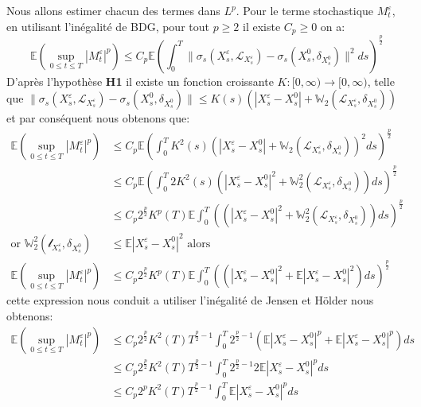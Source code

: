 \documentclass[12pt,a4paper,twoside,fleqn]{book}%
\theoremstyle{definition}
\theoremstyle{lemme}
\numberwithin{equation}{section}
\begin{document}
Nous allons estimer chacun des termes dans $L^p$. 
Pour le terme stochastique $M_t^\varepsilon$, en utilisant l'inégalité de BDG, pour tout $p\geq2$ il existe $C_p\geq0$ on a:
\[
\mathbb{E}\left(\sup_{0\leq t \leq T}|M_t^\varepsilon|^p\right)\leq C_p\mathbb{E}\left(\int_{0}^{T}\|\sigma_s(X_s^\varepsilon,\mathcal{L}_{X_s^\varepsilon})-\sigma_s(X_s^0,\delta_{X_s^0})\|^2ds\right)^{\frac{p}{2}}
\]
D’après l’hypothèse \textbf{H1} il existe un fonction croissante $K:[0,\infty)\to[0,\infty)$, telle que $\|\sigma_s(X_s^\varepsilon,\mathcal{L}_{X_s^\varepsilon})-\sigma_s(X_s^0,\delta_{X_s^0})\|\leq K(s)\left(|X_s^\varepsilon-X_s^0|+\mathbb{W}_2(\mathcal{L}_{X_s^\varepsilon},\delta_{X_s^0})\right)$ et par conséquent nous obtenons que:
\[
\begin{aligned}
\mathbb{E}\left(\sup_{0\leq t \leq T}|M_t^\varepsilon|^p\right)&\leq C_p\mathbb{E}\left(\int_{0}^{T}K^2(s)\left(|X_s^\varepsilon-X_s^0|+\mathbb{W}_2(\mathcal{L}_{X_s^\varepsilon},\delta_{X_s^0})\right)^2ds\right)^{\frac{p}{2}}\\
&\leq C_p\mathbb{E}\left(\int_{0}^{T}2K^2(s)\left(|X_s^\varepsilon-X_s^0|^2+\mathbb{W}_2^2(\mathcal{L}_{X_s^\varepsilon},\delta_{X_s^0})\right)ds\right)^{\frac{p}{2}}\\
&\leq C_p2^{\frac{p}{2}}K^p(T)\mathbb{E}\int_{0}^{T}\left(\left(|X_s^\varepsilon-X_s^0|^2+\mathbb{W}_2^2(\mathcal{L}_{X_s^\varepsilon},\delta_{X_s^0})\right)ds\right)^{\frac{p}{2}}\\
\text{or } \mathbb{W}_2^2(\mathcal{l}_{X_s^\varepsilon},\delta_{X_s^0})&\leq \mathbb{E}|X_s^\varepsilon-X_s^0|^2 \text{ alors }\\
\mathbb{E}\left(\sup_{0\leq t \leq T}|M_t^\varepsilon|^p\right)&\leq C_p2^{\frac{p}{2}}K^p(T)\mathbb{E}\int_{0}^{T}\left(\left(|X_s^\varepsilon-X_s^0|^2 +\mathbb{E}|X_s^\varepsilon-X_s^0|^2\right)ds\right)^{\frac{p}{2}}
\end{aligned}
\]
cette expression nous conduit a utiliser l'inégalité de Jensen et Hölder nous obtenons:
\[
\begin{aligned}
\mathbb{E}\left(\sup_{0\leq t \leq T}|M_t^\varepsilon|^p\right)&\leq C_p2^{\frac{p}{2}}K^2(T)T^{\frac{p}{2}-1}\int_{0}^{T}2^{\frac{p}{2}-1}\left(\mathbb{E}|X_s^\varepsilon-X_s^0|^p +\mathbb{E}|X_s^\varepsilon-X_s^0|^p\right) ds\\
&\leq C_p2^{\frac{p}{2}}K^2(T)T^{\frac{p}{2}-1}\int_{0}^{T}2^{\frac{p}{2}-1}2\mathbb{E}|X_s^\varepsilon-X_s^0|^pds\\
&\leq C_p2^pK^2(T)T^{\frac{p}{2}-1}\int_{0}^{T}\mathbb{E}|X_s^\varepsilon-X_s^0|^pds
\end{aligned}
\]
\end{document}
